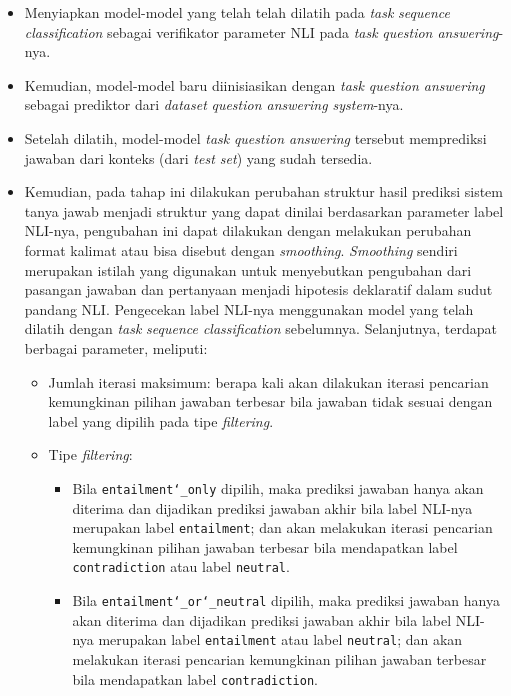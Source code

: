 \begin{itemize}
    
    \item Menyiapkan model-model yang telah telah dilatih pada \emph{task} \emph{sequence classification} sebagai verifikator parameter NLI pada \emph{task} \emph{question answering}-nya.

    \item Kemudian, model-model baru diinisiasikan dengan \emph{task} \emph{question answering} sebagai prediktor dari \emph{dataset} \emph{question answering system}-nya.
    
    \item Setelah dilatih, model-model \emph{task} \emph{question answering} tersebut memprediksi jawaban dari konteks (dari \emph{test set}) yang sudah tersedia.
    
    \item Kemudian, pada tahap ini dilakukan perubahan struktur hasil prediksi sistem tanya jawab menjadi struktur yang dapat dinilai berdasarkan parameter label NLI-nya, pengubahan ini dapat dilakukan dengan melakukan perubahan format kalimat atau bisa disebut dengan \emph{smoothing}. \emph{Smoothing} sendiri merupakan istilah yang digunakan untuk menyebutkan pengubahan dari pasangan jawaban dan pertanyaan menjadi hipotesis deklaratif dalam sudut pandang NLI. Pengecekan label NLI-nya menggunakan model yang telah dilatih dengan \emph{task} \emph{sequence classification} sebelumnya. Selanjutnya, terdapat berbagai parameter, meliputi:
    
    \begin{itemize}
    \item Jumlah iterasi maksimum: berapa kali akan dilakukan iterasi pencarian kemungkinan pilihan jawaban terbesar bila jawaban tidak sesuai dengan label yang dipilih pada tipe \emph{filtering}.
    
    \item Tipe \emph{filtering}:
    \begin{itemize}
        \item Bila \texttt{entailment\char`_only} dipilih, maka prediksi jawaban hanya akan diterima dan dijadikan prediksi jawaban akhir bila label NLI-nya merupakan label \texttt{entailment}; dan akan melakukan iterasi pencarian kemungkinan pilihan jawaban terbesar bila mendapatkan label \texttt{contradiction} atau label \texttt{neutral}.
        
        \item Bila \texttt{entailment\char`_or\char`_neutral} dipilih, maka prediksi jawaban hanya akan diterima dan dijadikan prediksi jawaban akhir bila label NLI-nya merupakan label \texttt{entailment} atau label \texttt{neutral}; dan akan melakukan iterasi pencarian kemungkinan pilihan jawaban terbesar bila mendapatkan label \texttt{contradiction}. 
    \end{itemize}
    

\end{itemize}
\end{itemize}
